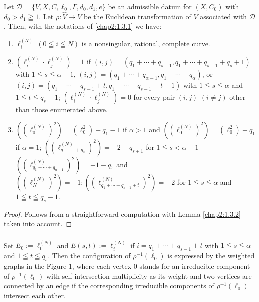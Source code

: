\subsubsection{}\label{chap2:1.3.3}
\begin{lemma*}
  Let $\mathscr{D}=\{V,X,C,\ell_{0},\Gamma,d_{0},d_{1},e\}$ be an
  admissible datum for $(X,C_{0})$ with $d_{0}>d_{1}\geqq 1$. Let
  $\rho:\widehat{V}\to V$ be the Euclidean transformation of $V$
  associated with $\mathscr{D}$. Then, with the notations of \ref{chap2:1.3.1}
  we have:
  \begin{enumerate}
    \renewcommand{\labelenumi}{\rm(\theenumi)}
  \item $\ell^{(N)}_{i}~(0\leqq i\leqq N)$ is a nonsingular, rational,
    complete curve.
    
  \item $(\ell_{i}^{(N)}\cdot\ell^{(N)}_{j})=1$ if
    $(i,j)=(q_{1}+\cdots+q_{s-1},q_{1}+\cdots+q_{s-1}+q_{s}+1)$ with
    $1\leqq s\leqq \alpha-1$,
    $(i,j)=(q_{1}+\cdots+q_{\alpha-1},q_{1}+\cdots+q_{\alpha})$, or
    $(i,j)=(q_{1}+\cdots+q_{s-1}+t,q_{1}+\cdots+q_{s-1}+t+1)$ with
    $1\leqq s\leqq \alpha$ and $1\leqq t\leqq q_{s}-1$;
    $(\ell^{(N)}_{i}\cdot \ell^{(N)}_{j})=0$ for every pair $(i,j)$
    $(i\neq j)$ other than those enumerated above.
    
  \item $((\ell_{0}^{(N)})^{2})=(\ell^{2}_{0})-q_{1}-1$ if $\alpha>1$
    and $((\ell_{0}^{(N)})^{2})=(\ell^{2}_{0})-q_{1}$ if $\alpha=1$;
    $((\ell^{(N)}_{q_{1}+\cdots+q_{s}})^{2})=-2-q_{s+1}$ for $1\leqq
    s<\alpha-1$ $((\ell^{(N)}_{q_{1}+\cdots+q_{\alpha-1}})^{2})=-1-q$,\pageoriginale\
    and
    $((\ell^{(N)}_{N})^{2})=-1;((\ell^{(N)}_{q_{1}+\cdots+q_{s-1}+t})^{2})=-2$
    for $1\leqq s\leqq\alpha$ and $1\leqq t\leqq q_{s}-1$.
  \end{enumerate}
\end{lemma*}

\begin{proof}
Follows from a straightforward computation with Lemma \ref{chap2:1.3.2}
taken into account.
\end{proof}

\subsubsection{}\label{chap2:1.3.4}
Set $E_{0}:=\ell_{0}^{(N)}$ and $E(s,t):=\ell^{(N)}_{i}$ if
$i=q_{1}+\cdots+q_{s-1}+t$ with $1\leqq s\leqq \alpha$ and $1\leqq
t\leqq q_{s}$. Then the configuration of $\rho^{-1}(\ell_{0})$ is
expressed by the weighted graphs in the Figure 1, where each vertex
$0$ stands for an irreducible component of $\rho^{-1}(\ell_{0})$ with
self-intersection multiplicity as its weight and two vertices are
connected by an edge if the corresponding irreducible components of
$\rho^{-1}(\ell_{0})$ intersect each other.

